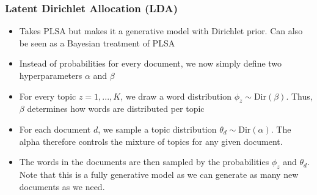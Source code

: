 \subsubsection{Latent Dirichlet Allocation (LDA)}
\begin{itemize}
	\item Takes PLSA but makes it a generative model with Dirichlet prior. Can also be seen as a Bayesian treatment of PLSA
	\item Instead of probabilities for every document, we now simply define two hyperparameters $\alpha$ and $\beta$
	\item For every topic $z=1,...,K$, we draw a word distribution $\phi_z \sim \text{Dir}(\beta)$. Thus, $\beta$ determines how words are distributed per topic
	\item For each document $d$, we sample a topic distribution $\theta_d \sim \text{Dir}(\alpha)$. The alpha therefore controls the mixture of topics for any given document.
	\item The words in the documents are then sampled by the probabilities $\phi_z$ and $\theta_d$. Note that this is a fully generative model as we can generate as many new documents as we need.
\end{itemize}
